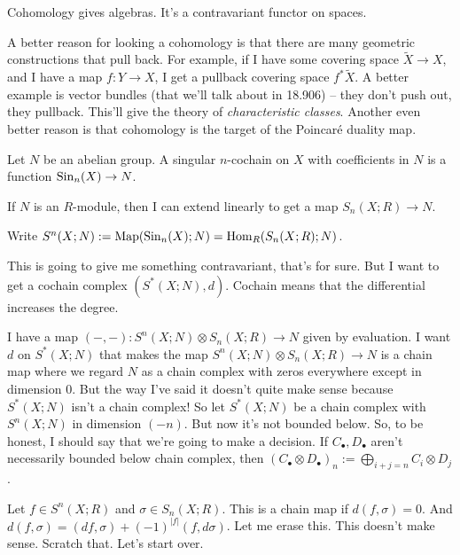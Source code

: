 \begin{slogan}
Cohomology gives algebras. It's a contravariant functor on spaces.
\end{slogan}
A better reason for looking a cohomology is that there are many geometric constructions that pull back. For example, if I have some covering space $\widetilde{X}\to X$, and I have a map $f:Y\to X$, I get a pullback covering space $f^{\ast}\widetilde{X}$. A better example is vector bundles (that we'll talk about in 18.906) -- they don't push out, they pullback. This'll give the theory of \emph{characteristic classes}. Another even better reason is that cohomology is the target of the Poincar\'{e} duality map.
\begin{definition}
Let $N$ be an abelian group. A singular $n$-cochain on $X$ with coefficients in $N$ is a function $\mathrm{Sin}_n(X)\to N$. 
\end{definition}
If $N$ is an $R$-module, then I can extend linearly to get a map $S_n(X;R)\to N$.
\begin{notation}
Write $S^n(X;N):=\operatorname{Map}(\mathrm{Sin}_n(X);N)=\operatorname{Hom}_R(S_n(X;R);N)$.
\end{notation}
This is going to give me something contravariant, that's for sure. But I want to get a cochain complex $(S^\ast(X;N),d)$. Cochain means that the differential increases the degree.

I have a map $(-,-):S^n(X;N)\otimes S_n(X;R)\to N$ given by evaluation. I want $d$ on $S^\ast(X;N)$ that makes the map $S^n(X;N)\otimes S_n(X;R)\to N$ is a chain map where we regard $N$ as a chain complex with zeros everywhere except in dimension $0$. But the way I've said it doesn't quite make sense because $S^\ast(X;N)$ isn't a chain complex! So let $S^\ast(X;N)$ be a chain complex with $S^n(X;N)$ in dimension $(-n)$. But now it's not bounded below. So, to be honest, I should say that we're going to make a decision. If $C_\bullet,D_\bullet$ aren't necessarily bounded below chain complex, then $(C_\bullet\otimes D_\bullet)_n:=\bigoplus_{i+j=n}C_i\otimes D_j$.

Let $f\in S^n(X;R)$ and $\sigma\in S_n(X;R)$. This is a chain map if $d (f,\sigma)=0$. And $d(f,\sigma)=(df,\sigma)+(-1)^{|f|}(f,d\sigma)$. Let me erase this. This doesn't make sense. Scratch that. Let's start over.

